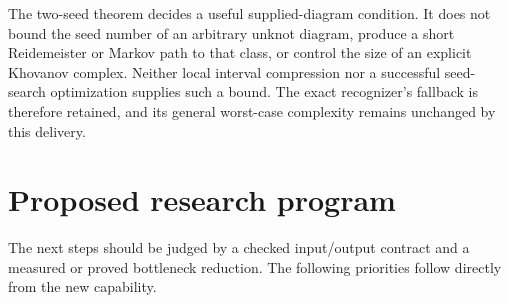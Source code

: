 \documentclass[11pt,a4paper]{article}
\theoremstyle{definition}\newtheorem{definition}[theorem]{Definition}
\theoremstyle{remark}\newtheorem{remark}[theorem]{Remark}
\begin{document}
The two-seed theorem decides a useful supplied-diagram condition. It does
not bound the seed number of an arbitrary unknot diagram, produce a short
Reidemeister or Markov path to that class, or control the size of an
explicit Khovanov complex. Neither local interval compression nor a
successful seed-search optimization supplies such a bound. The exact
recognizer's fallback is therefore retained, and its general worst-case
complexity remains unchanged by this delivery.

\section{Proposed research program}
\label{sec:future}

The next steps should be judged by a checked input/output contract and a
measured or proved bottleneck reduction. The following priorities follow
directly from the new capability.
\end{document}
